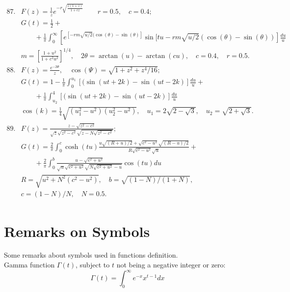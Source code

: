 \documentclass[10pt]{article}
\begin{document}
\[
\begin{array}{llr}
87. & F(z) = \frac{1}{z}e^{-r\sqrt{\frac{z(1+z)}{1+cz}}}\qquad  r=0.5, \quad  c=0.4;&\\[1cm]
& G(t) =  \frac{1}{2}+&\\[1cm]
    &\qquad +\frac{1}{\pi} \int_0^{\infty}\left [e^{[-rm\sqrt{u/2}(\cos(\theta) -\sin (\theta)]} \right. \left.\sin[tu -rm\sqrt{u/2}(\cos (\theta) -\sin(\theta)) \right ] \frac{du}{u}&\\[1cm]
 & m=\left [\frac{1+u^{2}}{1+c^{2}u^{2}}\right ]^{1/4},\quad 2\theta=\arctan(u)-\arctan(cu),\quad  c=0.4, \quad  r=0.5.\\[1cm]
88. & F(z) = \frac{e^{-2\Psi}}{z},\quad \cos(\Psi) =\sqrt{1+z^{2}+z^{4}/16};&\\[1cm]
    & G(t) =  1-\frac{1}{\pi}\int_{0}^{u_1}[(\sin(ut +2k)-\sin(ut-2k)]\frac{du}{u}+&\\[1cm]
    &\qquad +\frac{1}{\pi}\int_{u_2}^{4}[(\sin(ut +2k)-\sin(ut-2k)]\frac{du}{u} & \\[1cm]
& \cos(k) =\frac{1}{4}\sqrt{(u_1^{2}-u^{2})(u_2^{2}-u^{2})}, \quad    u_1=2\sqrt{2-\sqrt{3}},\quad u_2=\sqrt{2+\sqrt{3}}.& \\[1cm]
89. & F(z) = \frac{z-\sqrt{z^{2}-c^{2}}}{\sqrt{z}\sqrt{z^{2}-c^{2}}\sqrt{z-N\sqrt{z^{2}-c^{2}}}}; \\[1cm]
& G(t) =\frac{2}{\pi}\int_{0}^{c}\cosh(tu)\frac{u\sqrt{(R+u)/2}+\sqrt{c^{2}-u^{2}}\sqrt{(R-u)/2}}{R\sqrt{c^{2}-u^{2}}\sqrt{u}}+&\\[1cm]
    &\qquad +\frac{2}{\pi}\int_{0}^{b}\frac{u - \sqrt{c^{2}+u^{2}} }{\sqrt{u}\sqrt{c^{2}+u^{2}}\sqrt{N\sqrt{c^{2}+u^{2}}-u}}\cos(tu)du &\\[1cm]
& R= \sqrt{u^{2}+N^{2}(c^{2}-u^{2})}, \quad b= \sqrt{(1-N)/(1+N)},& \\[1cm]
& c=(1-N)/N, \quad N=0.5.& \\[1cm]
\end{array}
\]


\section{Remarks on Symbols}
Some remarks about symbols used in functions definition.\\

Gamma function $\Gamma (t)$, subject to $t$  not being a negative integer or zero:\\

$$ \Gamma (t) = \int_0^{\infty}e^{-x}x^{t-1}dx$$
\end{document}
